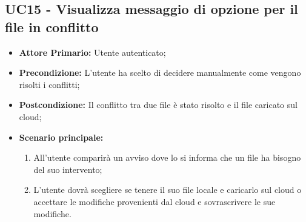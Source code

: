 \subsection{UC15 - Visualizza messaggio di opzione per il file in conflitto}
\label{UC15}
\begin{itemize}
\item \textbf{Attore Primario:} Utente autenticato;
\item \textbf{Precondizione:} L'utente ha scelto di decidere manualmente come vengono risolti i conflitti;
\item \textbf{Postcondizione:} Il conflitto tra due file è stato risolto e il file caricato sul cloud;
\item \textbf{Scenario principale:}
    \begin{enumerate}
    \item All'utente comparirà un avviso dove lo si informa che un file ha bisogno del suo intervento;
    \item L'utente dovrà scegliere se tenere il suo file locale e caricarlo sul cloud o accettare le modifiche provenienti dal cloud e sovrascrivere le sue modifiche.
    \end{enumerate}
\end{itemize}